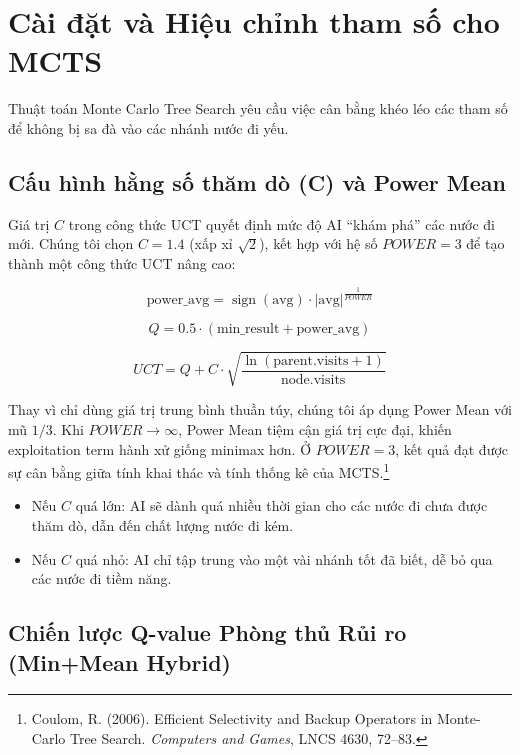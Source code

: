 \section{Cài đặt và Hiệu chỉnh tham số cho MCTS}

Thuật toán Monte Carlo Tree Search yêu cầu việc cân bằng khéo léo các tham số để không bị sa đà vào các nhánh nước đi yếu.

\subsection{Cấu hình hằng số thăm dò (C) và Power Mean}

Giá trị $C$ trong công thức UCT quyết định mức độ AI ``khám phá'' các nước đi mới. Chúng tôi chọn $C = 1.4$ (xấp xỉ $\sqrt{2}$), kết hợp với hệ số $POWER = 3$ để tạo thành một công thức UCT nâng cao:

\begin{equation}
\text{power\_avg} = \operatorname{sign}(\text{avg}) \cdot |\text{avg}|^{\frac{1}{POWER}}
\end{equation}

\begin{equation}
Q = 0.5 \cdot (\text{min\_result} + \text{power\_avg})
\end{equation}

\begin{equation}
UCT = Q + C \cdot \sqrt{\frac{\ln(\text{parent.visits} + 1)}{\text{node.visits}}}
\end{equation}

Thay vì chỉ dùng giá trị trung bình thuần túy, chúng tôi áp dụng Power Mean với mũ $1/3$. Khi $POWER \rightarrow \infty$, Power Mean tiệm cận giá trị cực đại, khiến exploitation term hành xử giống minimax hơn. Ở $POWER = 3$, kết quả đạt được sự cân bằng giữa tính khai thác và tính thống kê của MCTS.\footnote{Coulom, R. (2006). Efficient Selectivity and Backup Operators in Monte-Carlo Tree Search. \textit{Computers and Games}, LNCS 4630, 72–83.}

\begin{itemize}
    \item Nếu $C$ quá lớn: AI sẽ dành quá nhiều thời gian cho các nước đi chưa được thăm dò, dẫn đến chất lượng nước đi kém.
    \item Nếu $C$ quá nhỏ: AI chỉ tập trung vào một vài nhánh tốt đã biết, dễ bỏ qua các nước đi tiềm năng.
\end{itemize}

\subsection{Chiến lược Q-value Phòng thủ Rủi ro (Min+Mean Hybrid)}

